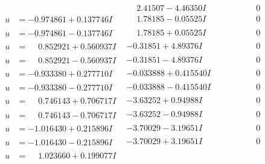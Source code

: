 \documentclass[1p]{elsarticle_modified}
\theoremstyle{definition}
\begin{document}
$$\begin{array}{c|c|c}
 & \phantom{-}2.41507 - 4.46350 I & \phantom{-0.000000 } 0 \\ \hline\begin{aligned}
u &= -0.974861 + 0.137746 I\end{aligned}
 & \phantom{-}1.78185 - 0.05525 I & \phantom{-0.000000 } 0 \\ \hline\begin{aligned}
u &= -0.974861 - 0.137746 I\end{aligned}
 & \phantom{-}1.78185 + 0.05525 I & \phantom{-0.000000 } 0 \\ \hline\begin{aligned}
u &= \phantom{-}0.852921 + 0.560937 I\end{aligned}
 & -0.31851 + 4.89376 I & \phantom{-0.000000 } 0 \\ \hline\begin{aligned}
u &= \phantom{-}0.852921 - 0.560937 I\end{aligned}
 & -0.31851 - 4.89376 I & \phantom{-0.000000 } 0 \\ \hline\begin{aligned}
u &= -0.933380 + 0.277710 I\end{aligned}
 & -0.033888 + 0.415540 I & \phantom{-0.000000 } 0 \\ \hline\begin{aligned}
u &= -0.933380 - 0.277710 I\end{aligned}
 & -0.033888 - 0.415540 I & \phantom{-0.000000 } 0 \\ \hline\begin{aligned}
u &= \phantom{-}0.746143 + 0.706717 I\end{aligned}
 & -3.63252 + 0.94988 I & \phantom{-0.000000 } 0 \\ \hline\begin{aligned}
u &= \phantom{-}0.746143 - 0.706717 I\end{aligned}
 & -3.63252 - 0.94988 I & \phantom{-0.000000 } 0 \\ \hline\begin{aligned}
u &= -1.016430 + 0.215896 I\end{aligned}
 & -3.70029 - 3.19651 I & \phantom{-0.000000 } 0 \\ \hline\begin{aligned}
u &= -1.016430 - 0.215896 I\end{aligned}
 & -3.70029 + 3.19651 I & \phantom{-0.000000 } 0 \\ \hline\begin{aligned}
u &= \phantom{-}1.023660 + 0.199077 I\end{aligned}

\end{array}$$
\end{document}
